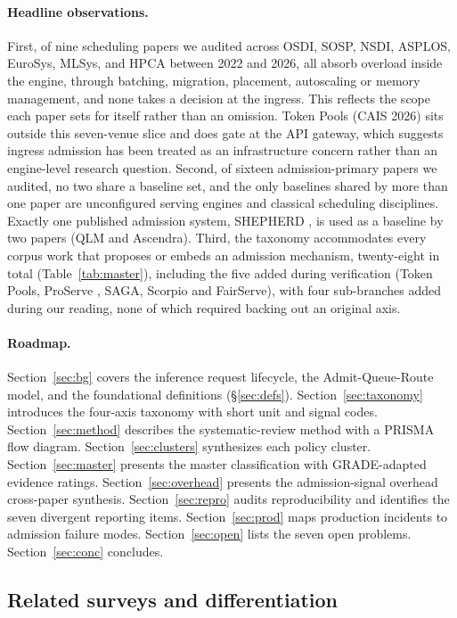 \documentclass[10pt]{article} %
\theoremstyle{definition}
\begin{document}
\paragraph{Headline observations.} First, of nine scheduling papers
we audited across OSDI, SOSP, NSDI, ASPLOS, EuroSys, MLSys, and HPCA
between 2022 and 2026, all absorb overload inside the engine, through
batching, migration, placement, autoscaling or memory management, and
none takes a decision at the ingress. This reflects the scope each
paper sets for itself rather than an omission. Token Pools (CAIS 2026)
sits outside this seven-venue slice and does gate at the API gateway,
which suggests ingress admission has been treated as an infrastructure
concern rather than an engine-level research question. Second, of sixteen admission-primary papers we
audited, no two share a baseline set, and the only
baselines shared by more than one paper are unconfigured serving engines
and classical scheduling disciplines. Exactly one published admission
system, SHEPHERD \citep{shepherd2023}, is used as a baseline by two papers (QLM and
Ascendra). Third, the taxonomy accommodates every corpus work that proposes or
embeds an admission mechanism, twenty-eight in total
(Table~\ref{tab:master}), including the five added during verification
(Token Pools, ProServe \citep{huang2026proserve}, SAGA, Scorpio and FairServe), with four
sub-branches added during our reading, none of which required
backing out an original axis.

\paragraph{Roadmap.} Section~\ref{sec:bg} covers the inference request
lifecycle, the Admit-Queue-Route model, and the foundational
definitions (\S\ref{sec:defs}). Section~\ref{sec:taxonomy} introduces
the four-axis taxonomy with short unit and signal codes.
Section~\ref{sec:method} describes the systematic-review method with a
PRISMA flow diagram. Section~\ref{sec:clusters} synthesizes each
policy cluster. Section~\ref{sec:master} presents the master
classification with GRADE-adapted evidence ratings.
Section~\ref{sec:overhead} presents the admission-signal overhead
cross-paper synthesis. Section~\ref{sec:repro} audits reproducibility
and identifies the seven divergent reporting items. Section~\ref{sec:prod} maps
production incidents to admission failure modes.
Section~\ref{sec:open} lists the seven open problems.
Section~\ref{sec:conc} concludes.

\subsection{Related surveys and differentiation}
\end{document}
